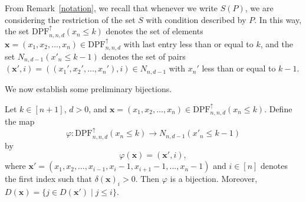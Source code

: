 \documentclass[11pt,reqno]{BICA}
\theoremstyle{definition}
\newcommand{\NDDPF}{\mathrm{DPF}^\uparrow}
\newcommand{\x}{\mathbf{x}}
\begin{document}
From Remark~\ref{notation}, we recall that whenever we write $S(P)$, we are considering the restriction of the set $S$ with condition described by $P$. In this way, the set
$\NDDPF_{n,n,d}(x_n \leq k)$ denotes the set of elements $\x=(x_1,x_2,\ldots, x_n)\in \NDDPF_{n,n,d}$ with last entry less than or equal to $k$, and the set 
$N_{n,d-1}(x'_n \leq k-1)$ denotes the set of pairs $(\x', i) = ((x_1',x_2',\ldots,x_n'), i)\in N_{n,d-1}$ with $x_n'$ less than or equal to $k-1$.



We now establish some preliminary bijections.

\begin{lemma}\label{lem:dpf-bij}
    Let $k \in [n+1]$, $d > 0$, and $\x=(x_1,x_2,\ldots,x_n)\in \NDDPF_{n,n,d}(x_n \leq k)$.
    Define the  map \[\varphi: \NDDPF_{n,n,d}(x_n \leq k) \to N_{n,d-1}(x'_n \leq k-1)\]
    by 
    \[\varphi(\x )=(\x',i),\] 
    where 
    $\x'=
(x_1,x_2,\ldots,x_{i-1},x_{i}-1,x_{i+1}-1,\ldots,x_n-1)$ and $i\in[n]$ denotes the first index such that $\delta(\x)_i > 0$.
Then 
$\varphi$ is a bijection.
Moreover, 
    $D(\x) = \{j \in D(\x') \mid j \leq i\}$.
\end{lemma}
\end{document}
